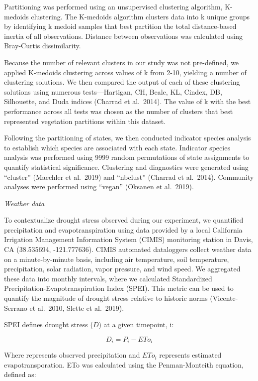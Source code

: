 \documentclass[twoside,12pt,final]{ucthesis-CA2012}
\begin{document}
\begin{ucmainmatter}
Partitioning was performed using an unsupervised clustering algorithm, K-medoids clustering.
The K-medoids algorithm clusters data into k unique groups by identifying k medoid samples that best partition the total distance-based inertia of all observations.
Distance between observations was calculated using Bray-Curtis dissimilarity.

Because the number of relevant clusters in our study was not pre-defined, we applied K-medoids clustering across values of k from 2-10, yielding a number of clustering solutions.
We then compared the output of each of these clustering solutions using numerous tests---Hartigan, CH, Beale, KL, Cindex, DB, Silhouette, and Duda indices (Charrad et al.~2014).
The value of k with the best performance across all tests was chosen as the number of clusters that best represented vegetation partitions within this dataset.

Following the partitioning of states, we then conducted indicator species analysis to establish which species are associated with each state.
Indicator species analysis was performed using 9999 random permutations of state assignments to quantify statistical significance.
Clustering and diagnostics were generated using ``cluster'' (Maechler et al.~2019) and ``nbclust'' (Charrad et al.~2014).
Community analyses were performed using ``vegan'' (Oksanen et al.~2019).

\emph{Weather data}

To contextualize drought stress observed during our experiment, we quantified precipitation and evapotranspiration using data provided by a local California Irrigation Management Information System (CIMIS) monitoring station in Davis, CA (38.535694, -121.777636).
CIMIS automated dataloggers collect weather data on a minute-by-minute basis, including air temperature, soil temperature, precipitation, solar radiation, vapor pressure, and wind speed.
We aggregated these data into monthly intervals, where we calculated Standardized Precipitation-Evapotranspiration Index (SPEI).
This metric can be used to quantify the magnitude of drought stress relative to historic norms (Vicente-Serrano et al.~2010, Slette et al.~2019).

SPEI defines drought stress (\(D\)) at a given timepoint, i:

\[
D_i = P_i - ETo_i
\]

Where represents observed precipitation and \(ETo_i\) represents estimated evapotransporation. ETo was calculated using the Penman-Monteith equation, defined as:


\end{ucmainmatter}
\end{document}
